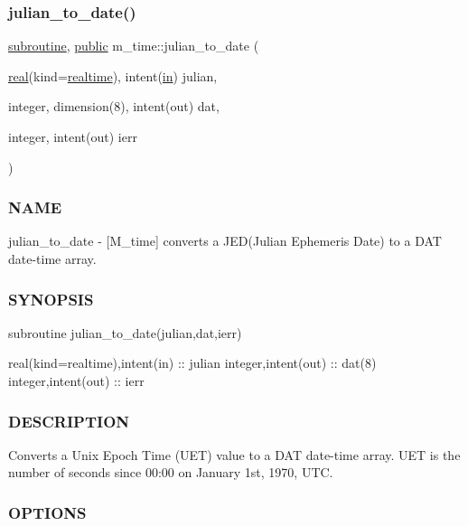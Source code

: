 \begin{DoxyVerb}
\subsubsection{\texorpdfstring{julian\+\_\+to\+\_\+date()}{julian\_to\_date()}}
{\footnotesize\ttfamily \hyperlink{M__stopwatch_83_8txt_acfbcff50169d691ff02d4a123ed70482}{subroutine}, \hyperlink{M__stopwatch_83_8txt_a2f74811300c361e53b430611a7d1769f}{public} m\+\_\+time\+::julian\+\_\+to\+\_\+date (\begin{DoxyParamCaption}\item[{\hyperlink{read__watch_83_8txt_abdb62bde002f38ef75f810d3a905a823}{real}(kind=\hyperlink{namespacem__time_ac10ea9e8d59ec74eaa7d89f2517d7422}{realtime}), intent(\hyperlink{M__journal_83_8txt_afce72651d1eed785a2132bee863b2f38}{in})}]{julian,  }\item[{integer, dimension(8), intent(out)}]{dat,  }\item[{integer, intent(out)}]{ierr }\end{DoxyParamCaption})}



\subsubsection*{N\+A\+ME}

julian\+\_\+to\+\_\+date -\/ \mbox{[}M\+\_\+time\mbox{]} converts a J\+E\+D(\+Julian Ephemeris Date) to a D\+AT date-\/time array. 

\subsubsection*{S\+Y\+N\+O\+P\+S\+IS}

\begin{DoxyVerb}subroutine julian_to_date(julian,dat,ierr)

 real(kind=realtime),intent(in) :: julian
 integer,intent(out)            :: dat(8)
 integer,intent(out)            :: ierr
\end{DoxyVerb}


\subsubsection*{D\+E\+S\+C\+R\+I\+P\+T\+I\+ON}

Converts a Unix Epoch Time (U\+ET) value to a D\+AT date-\/time array. U\+ET is the number of seconds since 00\+:00 on January 1st, 1970, U\+TC.

\subsubsection*{O\+P\+T\+I\+O\+NS}


\end{DoxyVerb}
